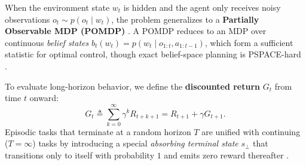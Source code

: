 \documentclass[../../../../master.tex]{subfiles}
\begin{document}
When the environment state $w_t$ is hidden and the agent only receives noisy observations $o_t \sim p(o_t \mid w_t)$, the problem generalizes to a \textbf{Partially Observable MDP (POMDP)} . A POMDP reduces to an MDP over continuous \emph{belief states} $b_t(w_t) = p(w_t \mid o_{1:t}, a_{1:t-1})$, which form a sufficient statistic for optimal control, though exact belief-space planning is PSPACE-hard .


To evaluate long-horizon behavior, we define the \textbf{discounted return} $G_t$ from time $t$ onward:
\begin{equation}\label{eq:mdp:return}
  G_t \triangleq \sum_{k=0}^{\infty} \gamma^k R_{t+k+1} = R_{t+1} + \gamma G_{t+1}.
\end{equation}
Episodic tasks that terminate at a random horizon $T$ are unified with continuing ($T = \infty$) tasks by introducing a special \emph{absorbing terminal state} $s_{\perp}$ that transitions only to itself with probability $1$ and emits zero reward thereafter .

\end{document}
